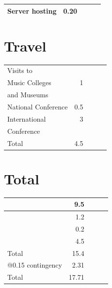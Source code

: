 \documentclass{tufte-handout}
\begin{document}
\begin{center}
\begin{tabular}{lrlll}
\hline
 Server hosting  &  0.20  &     &     &     \\
\hline
\end{tabular}
\end{center}
\section{Travel}
\label{sec-1-4}



\begin{center}
\begin{tabular}{lrlll}
\hline
 Visits to            &       &     &     &     \\
 Music Colleges       &    1  &     &     &     \\
 and Museums          &       &     &     &     \\
\hline
 National Conference  &  0.5  &     &     &     \\
\hline
 International        &    3  &     &     &     \\
 Conference           &       &     &     &     \\
\hline
 Total                &  4.5  &     &     &     \\
\hline
\end{tabular}
\end{center}
\section{Total}
\label{sec-1-5}



\begin{center}
\begin{tabular}{lrlll}
\hline
                    &    9.5  &     &     &     \\
\hline
                    &    1.2  &     &     &     \\
\hline
                    &    0.2  &     &     &     \\
\hline
                    &    4.5  &     &     &     \\
\hline
 Total              &   15.4  &     &     &     \\
\hline
 @0.15 contingency  &   2.31  &     &     &     \\
\hline
 Total              &  17.71  &     &     &     \\
\hline
\end{tabular}
\end{center}
\end{document}
